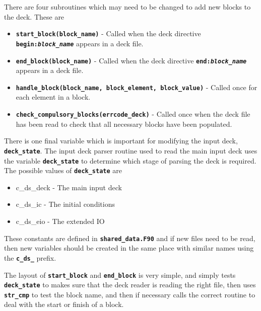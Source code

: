 \documentclass[12pt,a4paper]{article}
\newcommand{\inlinecode}[1]{{\color{warwickred} \bf\texttt{#1}}}
\begin{document}
There are four subroutines which may need to be changed to add new blocks to
the deck. These are
\begin{itemize}
\item \inlinecode{start\_block(block\_name)} - Called when the deck directive
  \inlinecode{begin:{\it block\_name}} appears in a deck file.
\item \inlinecode{end\_block(block\_name)} - Called when the deck directive
  \inlinecode{end:{\it block\_name}} appears in a deck file.
\item \inlinecode{handle\_block(block\_name, block\_element, block\_value)} - Called once
  for each element in a block.
\item \inlinecode{check\_compulsory\_blocks(errcode\_deck)} - Called once when the
  deck file has been read to check that all necessary blocks have been
  populated.
\end{itemize}

There is one final variable which is important for modifying the input deck,
\inlinecode{deck\_state}. The input deck parser routine used to read the main
input deck uses the variable \inlinecode{deck\_state} to
determine which stage of parsing the deck is required. The possible values of
\inlinecode{deck\_state} are

\begin{itemize}
\item c\_ds\_deck - The main input deck
\item c\_ds\_ic - The initial conditions
\item c\_ds\_eio - The extended IO
\end{itemize}
These constants are defined in \inlinecode{shared\_data.F90} and if new files
need to be read, then new variables should be created in the same place with
similar names using the \inlinecode{c\_ds\_} prefix.

The layout of \inlinecode{start\_block} and \inlinecode{end\_block} is very simple,
and simply tests \inlinecode{deck\_state} to makes sure that the deck reader is
reading the right file, then uses \inlinecode{str\_cmp} to test the block name,
and then if necessary calls the correct routine to deal with the start or
finish of a block.
\end{document}
